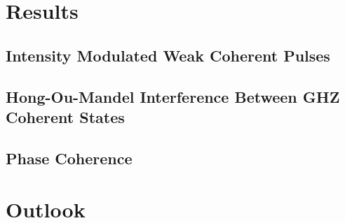 \section{Results}

\subsection{Intensity Modulated Weak Coherent Pulses}



\subsection{Hong-Ou-Mandel Interference Between GHZ Coherent States}

\subsection{Phase Coherence}

\section{Outlook}

